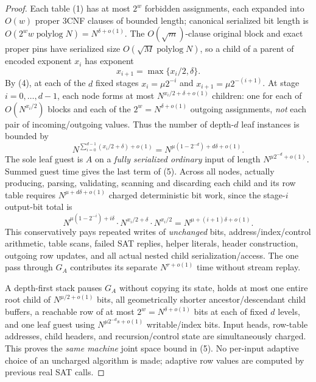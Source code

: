 \documentclass[11pt]{article}
\begin{document}
\begin{proof}
Each table (1) has at most $2^w$ forbidden assignments, each expanded
into $O(w)$ proper 3CNF clauses of bounded length; canonical serialized
bit length is $O(2^w w\operatorname{polylog}N)=N^{\delta+o(1)}$.
The $O(\sqrt m)$-clause original block and exact proper pins have
serialized size $O(\sqrt M\operatorname{polylog}N)$, so a child of a
parent of encoded exponent $x_i$ has exponent
\[
x_{i+1}=\max\{x_i/2,\delta\}.
\]
By (4), at each of the $d$ fixed stages
$x_i=\mu2^{-i}$ and
$x_{i+1}=\mu2^{-(i+1)}$.  At stage $i=0,\dots,d-1$, each
node forms at most $N^{x_i/2+\delta+o(1)}$ children: one for
each of $O(N^{x_i/2})$ blocks and each of the $2^w=N^{\delta+o(1)}$
outgoing assignments, \emph{not} each pair of incoming/outgoing values.
Thus the number of depth-$d$ leaf instances is bounded by
\[
N^{\sum_{i=0}^{d-1}(x_i/2+\delta)+o(1)}
=N^{\mu(1-2^{-d})+d\delta+o(1)}.
\]
The sole leaf guest is $A$ on a \emph{fully serialized ordinary} input
of length $N^{\mu2^{-d}+o(1)}$.  Summed guest time gives the last term
of (5).  Across all nodes, actually producing, parsing, validating,
scanning and discarding each child and its row table requires
$N^{\mu+d\delta+o(1)}$ charged deterministic bit work, since the
stage-$i$ output-bit total is
\[
N^{\mu(1-2^{-i})+i\delta}\cdot
N^{x_i/2+\delta}\cdot N^{x_i/2}
=N^{\mu+(i+1)\delta+o(1)}.
\]
This conservatively pays repeated writes of \emph{unchanged} bits,
address/index/control arithmetic, table scans, failed SAT replies,
helper literals, header construction, outgoing row updates, and all
actual nested child serialization/access.  The one pass through
$G_A$ contributes its separate $N^{r+o(1)}$ time without stream replay.

A depth-first stack pauses $G_A$ without copying its state, holds
at most one entire root child of $N^{\mu/2+o(1)}$ bits, all
geometrically shorter ancestor/descendant child buffers, a reachable
row of at most $2^w=N^{\delta+o(1)}$ bits at each of fixed $d$
levels, and one leaf guest using
$N^{\mu2^{-d}s+o(1)}$ writable/index bits.
Input heads, row-table addresses, child headers, and recursion/control
state are simultaneously charged. This proves the \emph{same
machine} joint space bound in (5). No per-input adaptive choice of
an uncharged algorithm is made; adaptive row values are computed by
previous real SAT calls.
\end{proof}
\end{document}
